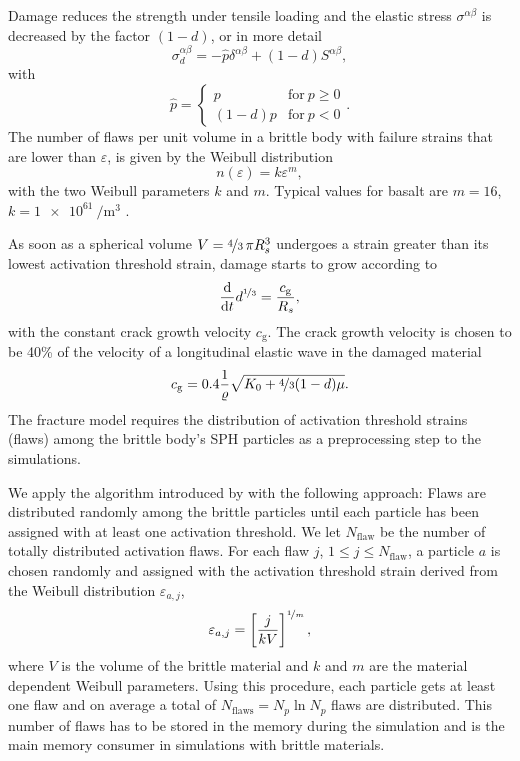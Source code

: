 \documentclass[10pt,fleqn,twoside]{article}
\begin{document}
Damage reduces the strength under tensile loading and the elastic stress $\sigma^{\alpha \beta}$ is decreased
by the factor $(1-d)$, or in more detail
%
\begin{equation}
 \sigma^{\alpha \beta}_d = -\hat{p} \delta^{\alpha \beta} + (1-d) S^{\alpha \beta},
\end{equation}
with
\begin{equation}
 \hat{p} = \left\{ \begin{array}{ll} p  & \mathrm{for} \ p \geq 0 \\
  (1-d) p & \mathrm{for} \ p < 0\end{array} \right. .
\end{equation}
%
The number of flaws per unit volume in a brittle body with failure strains that are lower than $\varepsilon$, is given by
the Weibull distribution \citep{weibull:1939}
%
\begin{equation}
 n(\varepsilon) = k \varepsilon^m,
\end{equation}
with the two Weibull parameters $k$ and $m$. Typical values for basalt are $m=16$, $k=\SI{1e61}{\per
  \cubic\metre}$ \citep{2007JGRE..112.2001N}.

As soon as a spherical volume $V= \nicefrac{4}{3} \, \pi R_s^3$ undergoes a strain greater than its lowest activation threshold
strain, damage starts to grow according to
%
\begin{equation}
 \label{eq:damage_growth}
 \frac{\mathrm{d}}{\mathrm{d}t} d^{\nicefrac{1}{3}} = \frac{c_\mathrm{g}}{R_s},
\end{equation}
%
with the constant crack growth velocity $c_\mathrm{g}$. The crack growth velocity is chosen to be 40\% of the velocity of
a longitudinal elastic wave in the damaged material
%
\begin{equation}
 c_\mathrm{g} = \num{0.4} \frac{1}{\varrho} \sqrt{ K_0 + \nicefrac{4}{3} (1-d) \mu}.
\end{equation}
%
The fracture model requires the distribution of activation threshold strains (flaws) among the brittle body's SPH particles as a preprocessing step to the simulations.
%

We apply the algorithm introduced by \cite{benz:1995} with the following approach: Flaws
are distributed randomly among the brittle particles until each particle has been assigned with at least one activation
threshold. We let $N_\mathrm{flaw}$ be the number of totally distributed activation flaws. For each flaw $j$, $1\leq j \leq
 N_\mathrm{flaw}$, a particle $a$ is chosen randomly and assigned with the activation threshold strain derived from the
Weibull distribution $\varepsilon_{a,j}$,
%
\begin{equation}
 \varepsilon_{a,j} = \left[ \frac{j}{kV} \right]^{\nicefrac{1}{m}},
\end{equation}
%
where $V$ is the volume of the brittle material and $k$ and $m$ are the material dependent Weibull parameters. Using
this procedure, each particle gets at least one flaw and on average a total of $N_\mathrm{flaws} = N_p \ln N_p$ flaws
are distributed. This number of flaws has to be stored in the memory during the simulation and is the
main memory consumer in simulations with brittle materials.
\end{document}
